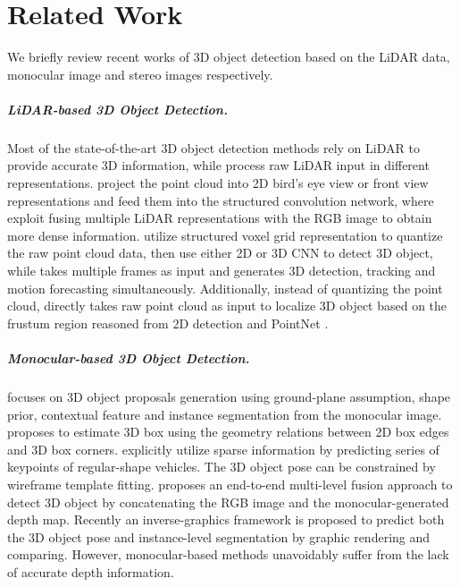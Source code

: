 \documentclass[10pt,twocolumn,letterpaper]{article}
\begin{document}
	\section{Related Work}
	We briefly review recent works of 3D object detection based on the LiDAR data, monocular image and stereo images respectively.
\vspace{-0.2cm}	
	{\setlength{\parindent}{0cm}
		\subparagraph*{LiDAR-based 3D Object Detection.}Most of the state-of-the-art 3D object detection methods rely on LiDAR to provide accurate 3D information, while process raw LiDAR input in different representations. \cite{chen2017multi,li2016vehicle,yang2018pixor,liang2018deep, ku2017joint} project the point cloud into 2D bird's eye view or front view representations and feed them into the structured convolution network, where \cite{chen2017multi,liang2018deep, ku2017joint} exploit fusing multiple LiDAR representations with the RGB image to obtain more dense information. \cite{engelcke2017vote3deep,wang2015voting,li20173d,luo2018fast,zhou2017voxelnet} utilize structured voxel grid representation to quantize the raw point cloud data, then use either 2D or 3D CNN to detect 3D object, while\cite{luo2018fast} takes multiple frames as input and generates 3D detection, tracking and motion forecasting simultaneously. Additionally, instead of quantizing the point cloud, \cite{qi2017frustum} directly takes raw point cloud as input to localize 3D object based on the frustum region reasoned from 2D detection and PointNet \cite{qi2017pointnet}.
	}
\vspace{-0.6cm}
	{\setlength{\parindent}{0cm}
		\subparagraph*{Monocular-based 3D Object Detection.}\cite{chen2016monocular} focuses on 3D object proposals generation using ground-plane assumption, shape prior, contextual feature and instance segmentation from the monocular image. \cite{mousavian20173d} proposes to estimate 3D box using the geometry relations between 2D box edges and 3D box corners.  
		\cite{zeeshan2014cars,chabot2017deep, murthy2017reconstructing} explicitly utilize sparse information by predicting series of keypoints of regular-shape vehicles. The 3D object pose can be constrained by wireframe template fitting. 
		\cite{cvpr18xu} proposes an end-to-end multi-level fusion approach to detect 3D object by concatenating the RGB image and the monocular-generated depth map.
		Recently an inverse-graphics framework \cite{kundu20183d} is proposed to predict both the 3D object pose and instance-level segmentation by graphic rendering and comparing. However, monocular-based methods unavoidably suffer from the lack of accurate depth information.
	}
\end{document}
